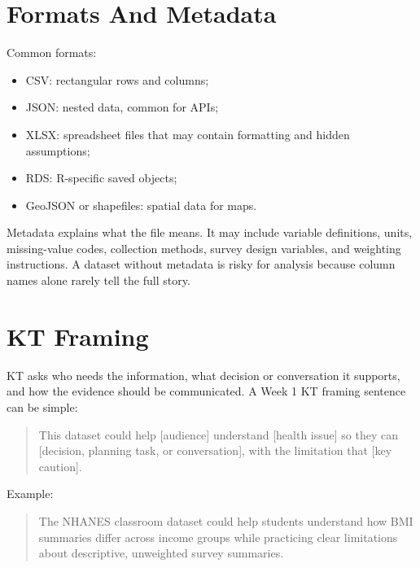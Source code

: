 \documentclass[
  letterpaper,
  DIV=11,
  numbers=noendperiod,
  oneside]{scrreprt}
\providecommand{\tightlist}{%
  \setlength{\itemsep}{0pt}\setlength{\parskip}{0pt}}
\begin{document}
\section*{Formats And Metadata}\label{formats-and-metadata}


Common formats:

\begin{itemize}
\tightlist
\item
  CSV: rectangular rows and columns;
\item
  JSON: nested data, common for APIs;
\item
  XLSX: spreadsheet files that may contain formatting and hidden
  assumptions;
\item
  RDS: R-specific saved objects;
\item
  GeoJSON or shapefiles: spatial data for maps.
\end{itemize}

Metadata explains what the file means. It may include variable
definitions, units, missing-value codes, collection methods, survey
design variables, and weighting instructions. A dataset without metadata
is risky for analysis because column names alone rarely tell the full
story.

\section*{KT Framing}\label{kt-framing}


KT asks who needs the information, what decision or conversation it
supports, and how the evidence should be communicated. A Week 1 KT
framing sentence can be simple:

\begin{quote}
This dataset could help {[}audience{]} understand {[}health issue{]} so
they can {[}decision, planning task, or conversation{]}, with the
limitation that {[}key caution{]}.
\end{quote}

Example:

\begin{quote}
The NHANES classroom dataset could help students understand how BMI
summaries differ across income groups while practicing clear limitations
about descriptive, unweighted survey summaries.
\end{quote}
\end{document}
